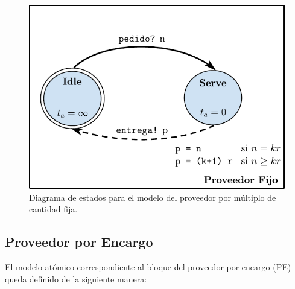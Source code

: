\documentclass[10pt]{article}
\begin{document}
\begin{figure}[htbp]
	\centering
	\includegraphics{img/proveedorFijodevsgraph}
	\caption{Diagrama de estados para el modelo del proveedor por múltiplo de cantidad fija.}
	\label{fig:PF-estados}
\end{figure}
\FloatBarrier

\subsection{Proveedor por Encargo\label{sec:PE}}
El modelo atómico correspondiente al bloque del proveedor por encargo (PE) queda definido de la siguiente manera:

\\
\end{document}
